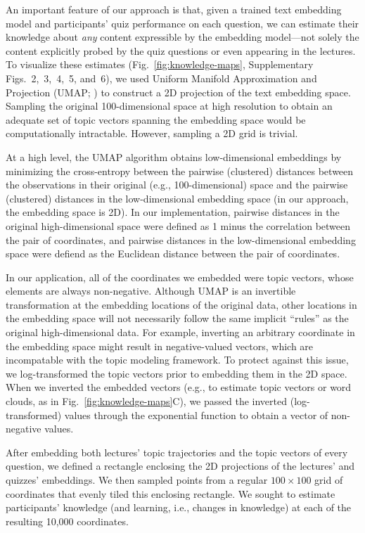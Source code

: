 \documentclass[10pt]{article}
\newcommand{\individualKnowledgeMapsA}{2}
\newcommand{\individualKnowledgeMapsB}{3}
\newcommand{\individualKnowledgeMapsC}{4}
\newcommand{\individualLearningMapsA}{5}
\newcommand{\individualLearningMapsB}{6}
\begin{document}
An important feature of our approach is that, given a trained text embedding
model and participants' quiz performance on each question, we can estimate
their knowledge about \textit{any} content expressible by the embedding
model---not solely the content explicitly probed by the quiz questions or even
appearing in the lectures. To visualize these estimates
(Fig.~\ref{fig:knowledge-maps}, Supplementary Figs.~\individualKnowledgeMapsA,~\individualKnowledgeMapsB,~\individualKnowledgeMapsC,~\individualLearningMapsA,
and~\individualLearningMapsB), we used Uniform Manifold Approximation and
Projection (UMAP; \citealp{McInEtal18a}) to construct a 2D projection of the
text embedding space. Sampling the original 100-dimensional space at high
resolution to obtain an adequate set of topic vectors spanning the embedding
space would be computationally intractable. However, sampling a 2D grid is
trivial.

At a high level, the UMAP algorithm obtains low-dimensional embeddings by
minimizing the cross-entropy between the pairwise (clustered) distances between
the observations in their original (e.g., 100-dimensional) space and the
pairwise (clustered) distances in the low-dimensional embedding space (in our
approach, the embedding space is 2D). In our implementation, pairwise distances
in the original high-dimensional space were defined as 1 minus the correlation
between the pair of coordinates, and pairwise distances in the low-dimensional
embedding space were defiend as the Euclidean distance between the pair of
coordinates.

In our application, all of the coordinates we embedded were topic vectors,
whose elements are always non-negative. Although UMAP is an invertible
transformation at the embedding locations of the original data, other locations
in the embedding space will not necessarily follow the same implicit ``rules''
as the original high-dimensional data. For example, inverting an arbitrary
coordinate in the embedding space might result in negative-valued vectors,
which are incompatable with the topic modeling framework. To protect against
this issue, we log-transformed the topic vectors prior to embedding them in the
2D space. When we inverted the embedded vectors (e.g., to estimate topic
vectors or word clouds, as in Fig.~\ref{fig:knowledge-maps}C), we passed the
inverted (log-transformed) values through the exponential function to obtain a
vector of non-negative values.

After embedding both lectures' topic trajectories and the topic vectors of
every question, we defined a rectangle enclosing the 2D projections of the
lectures' and quizzes' embeddings. We then sampled points from a regular $100
\times 100$ grid of coordinates that evenly tiled this enclosing rectangle. We
sought to estimate participants' knowledge (and learning, i.e., changes in
knowledge) at each of the resulting 10,000 coordinates.
\end{document}
